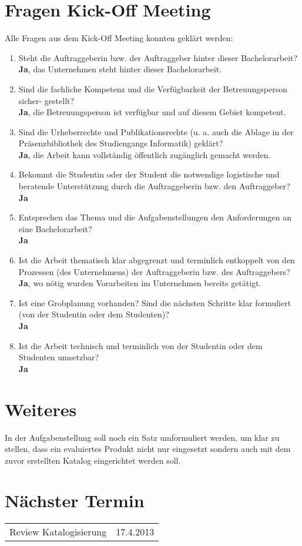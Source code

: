 \documentclass[]{scrreprt}
\begin{document}
    \section{Fragen Kick-Off Meeting}
    Alle Fragen aus dem Kick-Off Meeting konnten geklärt werden:
    \begin{enumerate}
        \item Steht die Auftraggeberin bzw. der Auftraggeber hinter dieser Bachelorarbeit? \\
            {\bf Ja}, das Unternehmen steht hinter dieser Bachelorarbeit.
        \item Sind die fachliche Kompetenz und die Verfügbarkeit der Betreuungsperson sicher- gestellt? \\
            {\bf Ja}, die Betreuungsperson ist verfügbar und auf diesem Gebiet kompetent.
        \item Sind die Urheberrechte und Publikationsrechte (u. a. auch die Ablage in der Präsenzbibliothek des Studiengangs Informatik) geklärt? \\
            {\bf Ja}, die Arbeit kann vollständig öffentlich zugänglich gemacht
            werden.
        \item Bekommt die Studentin oder der Student die notwendige logistische und beratende Unterstützung durch die Auftraggeberin bzw. den Auftraggeber? \\
            {\bf Ja}
        \item Entsprechen das Thema und die Aufgabenstellungen den Anforderungen an eine Bachelorarbeit? \\
            {\bf Ja}
        \item Ist die Arbeit thematisch klar abgegrenzt und terminlich entkoppelt von den Prozessen (des Unternehmens) der Auftraggeberin bzw. des Auftraggebers? \\
            {\bf Ja}, wo nötig wurden Vorarbeiten im Unternehmen bereits getätigt.
        \item Ist eine Grobplanung vorhanden? Sind die nächsten Schritte klar formuliert (von der Studentin oder dem Studenten)? \\
            {\bf Ja}
        \item Ist die Arbeit technisch und terminlich von der Studentin oder dem Studenten umsetzbar? \\
            {\bf Ja}
    \end{enumerate}
    
    \pagebreak
    \section{Weiteres}
      In der Aufgabenstellung soll noch ein Satz umformuliert werden, um klar zu stellen, dass ein evaluiertes Produkt nicht nur eingesetzt sondern auch mit dem zuvor erstellten Katalog eingerichtet werden soll.
    
    \section{Nächster Termin}
    \begin{tabular}{l r}
        Review Katalogisierung & 17.4.2013 \\
    \end{tabular}
    
\end{document}
